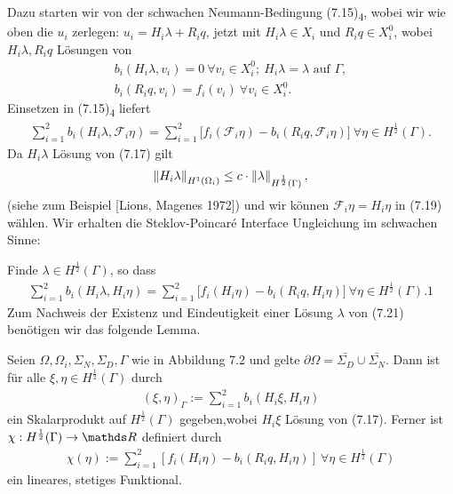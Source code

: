 Dazu starten wir von der schwachen Neumann-Bedingung (7.15)\textsubscript{4}, wobei wir wie oben die $u_i$ zerlegen: $u_i = H_i\lambda + R_i q$, jetzt mit $H_i\lambda\in X_i$ und $R_i q \in X_i^0$, wobei $H_i\lambda, R_i q$ Lösungen von
\begin{align}
b_i(H_i\lambda,v_i) = 0~ \forall v_i\in X_i^0;~ H_i\lambda = \lambda \text{ auf } \Gamma,\\
b_i(R_i q, v_i) = f_i(v_i) ~ \forall v_i\in X_i^0.
\end{align}
Einsetzen in (7.15)\textsubscript{4} liefert
\begin{align}
\sum_{i=1}^2 b_i(H_i\lambda,\mathcal{F}_i\eta) = \sum_{i=1}^2 \bigg[ f_i(\mathcal{F}_i\eta) - b_i(R_i q,\mathcal{F}_i\eta) \bigg] ~\forall \eta\in H^{\frac{1}{2}}(\Gamma).
\end{align}
Da $H_i\lambda$ Lösung von (7.17) gilt
\begin{align}
\left\Vert H_i\lambda\right\Vert_{H^1(\Omega_i)} \le c\cdot \left\Vert\lambda\right\Vert_{H^{\frac{1}{2}}(\Gamma)},
\end{align}
(siehe zum Beispiel [Lions, Magenes 1972]) und wir können $\mathcal{F}_i\eta = H_i\eta$ in (7.19) wählen.
Wir erhalten die Steklov-Poincaré Interface Ungleichung im schwachen Sinne:

Finde $\lambda\in H^{\frac{1}{2}}(\Gamma)$, so dass
\begin{align}
\sum_{i=1}^2 b_i(H_i\lambda,H_i\eta) = \sum_{i=1}^2 \bigg[ f_i(H_i\eta) - b_i(R_i q, H_i \eta) \bigg] ~\forall \eta\in H^{\frac{1}{2}}(\Gamma).1
\end{align}
Zum Nachweis der Existenz und Eindeutigkeit einer Lösung $\lambda$ von (7.21) benötigen wir das folgende Lemma.

Seien $\Omega,\Omega_i,\Sigma_N,\Sigma_D, \Gamma$ wie in Abbildung 7.2 und gelte $\partial\Omega= \bar{\Sigma_D}\cup \bar{\Sigma_N}$.
Dann ist für alle $\xi,\eta\in H^{\frac{1}{2}}(\Gamma)$ durch
\begin{align}
(\xi,\eta)_\Gamma := \sum_{i=1}^2 b_i(H_i\xi,H_i\eta)
\end{align}
ein Skalarprodukt auf $H^{\frac{1}{2}}(\Gamma)$ gegeben,wobei $H_i\xi$ Lösung von (7.17).
Ferner ist $\chi: H^{\frac{1}{2}}(\Gamma) \to \R$ definiert durch
\begin{align}
\chi(\eta) := \sum_{i=1}^2 [f_i(H_i\eta) - b_i(R_iq,H_i\eta)] ~ \forall \eta\in H^{\frac{1}{2}}(\Gamma)
\end{align}
ein lineares, stetiges Funktional.\\

